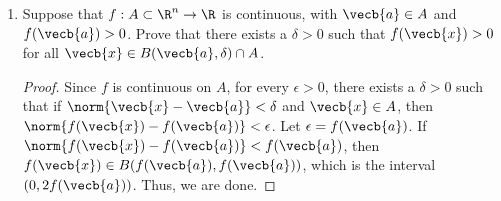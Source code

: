 \documentclass[letterpaper]{article}
\begin{document}
\begin{enumerate}
\begin{example*}
\begin{proof}


The set $f(U)$ is not open; since the origin $\vecb{0} \in f(U)$, but every $B(\vecb{0},r)$ contains points in every quadrant, so no open ball $B(\vecb{0},r)$ is a subset of $f(U)$.



Therefore, (2) fails. Thus, (1) $\centernot\implies$ (2). 
\end{proof}
\end{example*}

\item Suppose that  $f:A\subset \R^n\to \R$ is continuous, with $\vecb{a}\in A$ and $f(\vecb{a})>0$. Prove that there exists a $\delta>0$ such that $f(\vecb{x})>0$ for all $\vecb{x}\in B(\vecb{a},\delta)\cap A$. 
\begin{proof}
Since $f$ is continuous on $A$, for every $\epsilon>0$, there exists a $\delta>0$ such that if $\norm{\vecb{x}-\vecb{a}}<\delta$ and $\vecb{x}\in A$, then $\norm{f(\vecb{x})-f(\vecb{a})}<\epsilon$. Let $\epsilon=f(\vecb{a})$. If $\norm{f(\vecb{x})-f(\vecb{a})}<f(\vecb{a})$, then $f(\vecb{x})\in B(f(\vecb{a}), f(\vecb{a}))$, which is the interval $(0, 2f(\vecb{a}))$. Thus, we are done.
\end{proof}


\end{enumerate}
\end{document}
